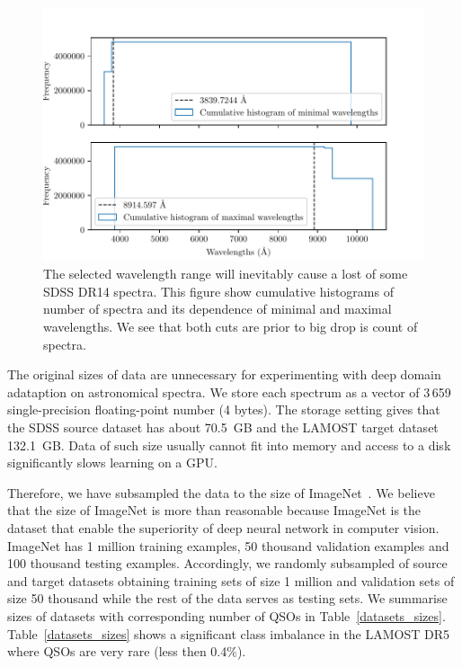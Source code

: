 \begin{figure}
\includegraphics[width=\textwidth]{img/waves_cumulative_hist.pdf}
\caption[Losts in SDSS DR14 spectra due to wavelength range]{
	The selected wavelength range will inevitably
	cause a lost of some SDSS DR14 spectra.
	This figure show cumulative histograms of number of spectra
	and its dependence of minimal and maximal wavelengths.
	We see that both cuts are prior to big drop is count of spectra.
	}
\label{waves_cumulative_hist}
\end{figure}

The original sizes of data are unnecessary for experimenting with deep domain adataption on astronomical spectra.
We store each spectrum as a vector of 3\,659 single-precision floating-point number (4 bytes).
The storage setting gives that the SDSS source dataset has about 70.5~GB
and the LAMOST target dataset 132.1~GB.
Data of such size usually cannot fit into memory
and access to a disk significantly slows learning on a GPU.

Therefore, we have subsampled the data to the size of ImageNet~\cite{russakovsky2015}.
We believe that the size of ImageNet is more than reasonable
because ImageNet is the dataset
that enable the superiority of deep neural network in computer vision.
ImageNet has 1 million training examples, 50 thousand validation examples
and 100 thousand testing examples.
Accordingly, we randomly subsampled of source and target datasets
obtaining training sets of size 1 million
and validation sets of size 50 thousand
while the rest of the data serves as testing sets.
We summarise sizes of datasets with corresponding number of QSOs in Table~\ref{datasets_sizes}.
Table~\ref{datasets_sizes} shows a significant class imbalance in the LAMOST DR5
where QSOs are very rare (less then 0.4\%).

